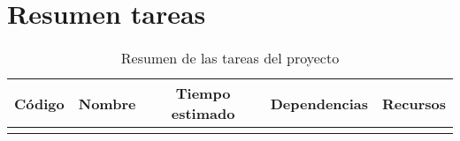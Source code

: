 \section{Resumen tareas}
\label{sec:tareas}

\begin{table}[H]
    \begin{center}
        \begin{tabular}{| c | c | c | c | c |}
            \hline
            \bf Código & \bf Nombre & \bf Tiempo estimado & \bf Dependencias & \bf Recursos \\ 
            \hline
             &  &  &  &  \\ 
            \hline
        \end{tabular}
        \caption{Resumen de las tareas del proyecto}
        \label{cuadro:tareas}
    \end{center}
\end{table}
